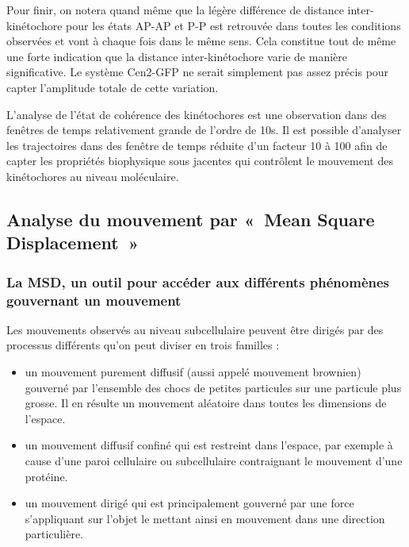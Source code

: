 \documentclass[12pt,a4paper,twoside,openright]{book}
\begin{document}
Pour finir, on notera quand même que la légère différence de distance
inter-kinétochore pour les états AP-AP et P-P est retrouvée dans toutes
les conditions observées et vont à chaque fois dans le même sens. Cela
constitue tout de même une forte indication que la distance
inter-kinétochore varie de manière significative. Le système Cen2-GFP ne
serait simplement pas assez précis pour capter l'amplitude totale de
cette variation.

L'analyse de l'état de cohérence des kinétochores est une observation
dans des fenêtres de temps relativement grande de l'ordre de 10s. Il est
possible d'analyser les trajectoires dans des fenêtre de temps réduite
d'un facteur 10 à 100 afin de capter les propriétés biophysique sous
jacentes qui contrôlent le mouvement des kinétochores au niveau
moléculaire.

\subsection{Analyse du mouvement par «~Mean Square
Displacement~»}\label{analyse-du-mouvement-par-mean-square-displacement}

\subsubsection{La MSD, un outil pour accéder aux différents phénomènes
gouvernant un
mouvement}\label{la-msd-un-outil-pour-accuxe9der-aux-diffuxe9rents-phuxe9nomuxe8nes-gouvernant-un-mouvement}

\label{sec:msd-tool}

Les mouvements observés au niveau subcellulaire peuvent être dirigés par
des processus différents qu'on peut diviser en trois familles :

\begin{itemize}
\item
  un mouvement purement diffusif (aussi appelé mouvement brownien)
  gouverné par l'ensemble des chocs de petites particules sur une
  particule plus grosse. Il en résulte un mouvement aléatoire dans
  toutes les dimensions de l'espace.
\item
  un mouvement diffusif confiné qui est restreint dans l'espace, par
  exemple à cause d'une paroi cellulaire ou subcellulaire contraignant
  le mouvement d'une protéine.
\item
  un mouvement dirigé qui est principalement gouverné par une force
  s'appliquant sur l'objet le mettant ainsi en mouvement dans une
  direction particulière.
\end{itemize}
\end{document}

